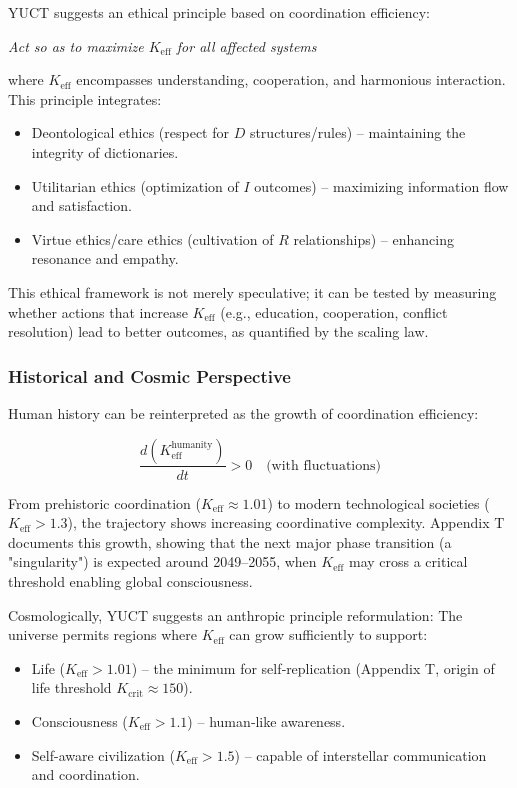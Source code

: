 \documentclass[12pt,a4paper]{article}
\newcommand{\eff}{\mathrm{eff}}
\newcommand{\Ke}{K_{\eff}}
\newcommand{\Kcrit}{K_{\mathrm{crit}}}
\begin{document}
	YUCT suggests an ethical principle based on coordination efficiency:
	
	\begin{center}
		\textit{Act so as to maximize $\Ke$ for all affected systems}
	\end{center}
	
	where $\Ke$ encompasses understanding, cooperation, and harmonious interaction. This principle integrates:
	\begin{itemize}
		\item Deontological ethics (respect for $D$ structures/rules) – maintaining the integrity of dictionaries.
		\item Utilitarian ethics (optimization of $I$ outcomes) – maximizing information flow and satisfaction.
		\item Virtue ethics/care ethics (cultivation of $R$ relationships) – enhancing resonance and empathy.
	\end{itemize}
	
	This ethical framework is not merely speculative; it can be tested by measuring whether actions that increase $\Ke$ (e.g., education, cooperation, conflict resolution) lead to better outcomes, as quantified by the scaling law.
	
	\subsubsection{Historical and Cosmic Perspective}
	
	Human history can be reinterpreted as the growth of coordination efficiency:
	
	\[
	\frac{d(\Ke^{\text{humanity}})}{dt} > 0 \quad \text{(with fluctuations)}
	\]
	
	From prehistoric coordination ($\Ke \approx 1.01$) to modern technological societies ($\Ke > 1.3$), the trajectory shows increasing coordinative complexity. Appendix T documents this growth, showing that the next major phase transition (a "singularity") is expected around 2049–2055, when $\Ke$ may cross a critical threshold enabling global consciousness.
	
	Cosmologically, YUCT suggests an anthropic principle reformulation: The universe permits regions where $\Ke$ can grow sufficiently to support:
	\begin{itemize}
		\item Life ($\Ke > 1.01$) – the minimum for self‑replication (Appendix T, origin of life threshold $\Kcrit \approx 150$).
		\item Consciousness ($\Ke > 1.1$) – human‑like awareness.
		\item Self-aware civilization ($\Ke > 1.5$) – capable of interstellar communication and coordination.
	\end{itemize}
	
\end{document}
